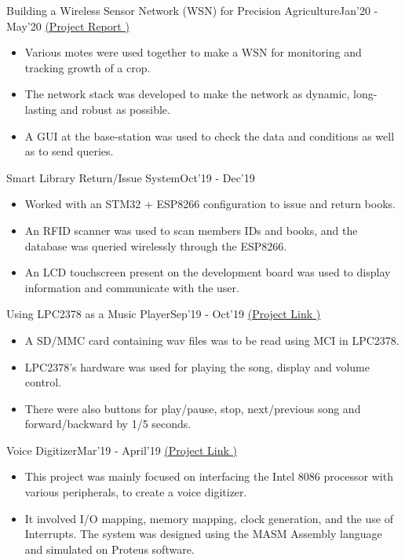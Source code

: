 \begin{projects}

\project
	{Building a Wireless Sensor Network (WSN) for Precision Agriculture}{Jan'20 - May'20}
	{\href{https://drive.google.com/file/d/1wIB6XobKUe-Rm_h03fx6rXY9kHtLBq16/view?usp=sharing}{(Project Report \pdfFileSymbol )}}
	{\begin{itemize}
	\setlength\itemsep{0.1em}
    \item Various motes were used together to make a WSN for monitoring and tracking growth of a crop.
    \item The network stack was developed to make the network as dynamic, long-lasting and robust as possible.
    \item A GUI at the base-station was used to check the data and conditions as well as to send queries.
     \end{itemize}}
     
\project
	{Smart Library Return/Issue System}{Oct'19 - Dec'19}
	{}
	{\begin{itemize}
	\setlength\itemsep{0.1em}
    \item Worked with an STM32 + ESP8266 configuration to issue and return books.
    \item An RFID scanner was used to scan members IDs and books, and the database was queried wirelessly through the ESP8266.
    \item An LCD touchscreen  present on the development board was used to display information and communicate with the user.
     \end{itemize}}
     
\project
	{Using LPC2378 as a Music Player}{Sep'19 - Oct'19}
	{\href{https://github.com/may-kumar/music-player_LPC-2378}{(Project Link \githubSymbol )}}
	{\begin{itemize}
	\setlength\itemsep{0.1em}
    \item A SD/MMC card containing wav files was to be read using MCI in LPC2378.
    \item LPC2378's hardware was used for playing the song, display and volume control.
    \item There were also buttons for play/pause, stop, next/previous song and forward/backward by 1/5 seconds.
     \end{itemize}}
     
\project
    {Voice Digitizer}{Mar'19 - April'19}
	{\href{https://github.com/may-kumar/voice-digitizer}{(Project Link \githubSymbol )}}
    {\begin{itemize}
	\setlength\itemsep{0.1em}
    \item This project was mainly focused on interfacing the Intel 8086 processor with various peripherals, to create a voice digitizer.
    \item It involved I/O mapping, memory mapping, clock generation, and the use of Interrupts. The system was designed using the MASM Assembly language and simulated on Proteus software.
     \end{itemize}}
 \end{projects}    
\vspace{-3mm}
